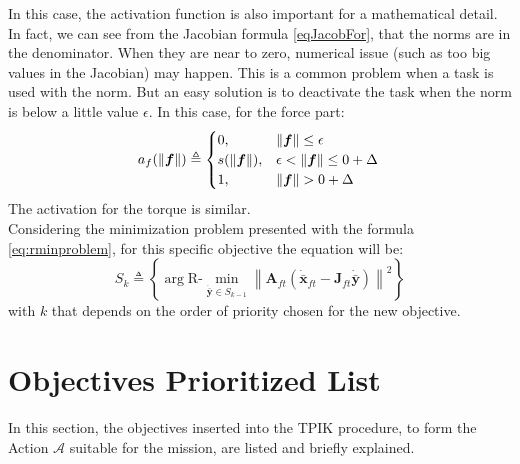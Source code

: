 In this case, the activation function is also important for a mathematical detail. In fact, we can see from the Jacobian formula \eqref{eqJacobFor}, that the norms are in the denominator. When they are near to zero, numerical issue (such as too big values in the Jacobian) may happen. This is a common problem when a task is used with the norm. But an easy solution is to deactivate the task when the norm is below a little value $\epsilon$. In this case, for the force part:
\begin{equation}
		a_f(\| \boldsymbol{f}\|) \triangleq
		\begin{cases}
			0,& \| \boldsymbol{f}\| \leq \epsilon \\
			s(\| \boldsymbol{f}\|), & \epsilon < \| \boldsymbol{f}\| \leq 0 + \Delta\\
			1, & \| \boldsymbol{f}\| > 0 + \Delta\\
		\end{cases} \\
\end{equation}
The activation for the torque is similar.\\

Considering the minimization problem presented with the formula \eqref{eq:rminproblem}, for this specific objective the equation will be:
\begin{equation}
	S_k \triangleq \left\{ \arg \mathrm{R\textrm{-}}\min_{\dot{\bar{\boldsymbol{y}}} \in S_{k-1}} \left\| \boldsymbol{A}_{ft} (\dot{\bar{\boldsymbol{x}}}_{ft} - \boldsymbol{J}_{ft} \dot{\bar{\boldsymbol{y}}}) \right\|^2 \right\}
\end{equation}
with $k$ that depends on the order of priority chosen for the new objective.


\section{Objectives Prioritized List}
\label{sec:taskList}
In this section, the objectives inserted into the TPIK procedure, to form the Action $\mathcal{A}$ suitable for the mission, are listed and briefly explained.\\

